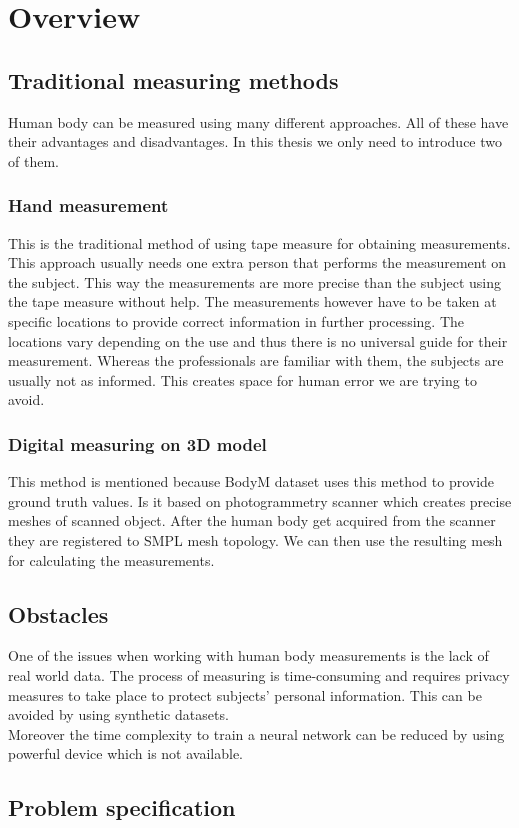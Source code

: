 \chapter{Overview}
\section{Traditional measuring methods}
Human body can be measured using many different approaches. All of these have their advantages and disadvantages. In this thesis we only need to introduce two of them.
\subsection{Hand measurement}
This is the traditional method of using tape measure for obtaining measurements. This approach usually needs one extra person that performs the measurement on the subject. This way the measurements are more precise than the subject using the tape measure without help. The measurements however have to be taken at specific locations to provide correct information in further processing. The locations vary depending on the use and thus there is no universal guide for their measurement. Whereas the professionals are familiar with them, the subjects are usually not as informed. This creates space for human error we are trying to avoid.
\subsection{Digital measuring on 3D model}
This method is mentioned because BodyM dataset uses this method to provide ground truth values. Is it based on photogrammetry scanner which creates precise meshes of scanned object. After the human body get acquired from the scanner they are registered to SMPL mesh topology. We can then use the resulting mesh for calculating the measurements.
\section{Obstacles}
One of the issues when working with human body measurements is the lack of real world data. The process of measuring is time-consuming and requires privacy measures to take place to protect subjects' personal information. This can be avoided by using synthetic datasets.\\
Moreover the time complexity to train a neural network can be reduced by using powerful device which is not available.
\section{Problem specification}

